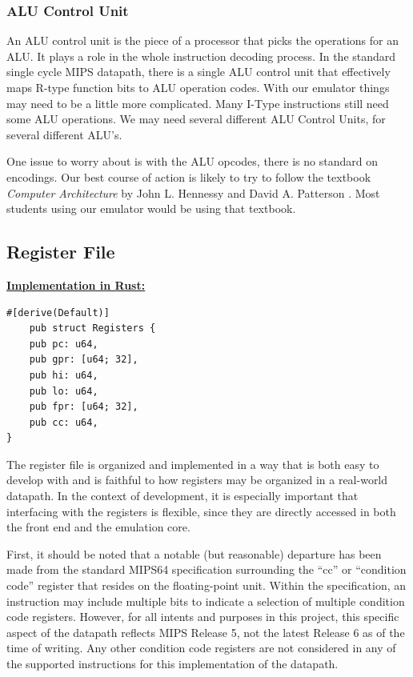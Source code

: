 \documentclass[
    paper=letter,
    parskip=half,
    fontsize=12pt,
    titlepage=firstiscover,
    toc=bibliography,
    numbers=endperiod
]{scrartcl}
\begin{document}
\subsubsection{ALU Control Unit}

An ALU control unit is the piece of a processor that picks the
operations for an ALU. It plays a role in the whole instruction decoding
process. In the standard single cycle MIPS datapath, there is a single
ALU control unit that effectively maps R-type function bits to ALU
operation codes. With our emulator things may need to be a little more
complicated. Many I-Type instructions still need some ALU operations. We
may need several different ALU Control Units, for several different
ALU's.

One issue to worry about is with the ALU opcodes, there is no standard
on encodings. Our best course of action is likely to try to follow the
textbook \emph{Computer Architecture} by John L. Hennessy and David A.
Patterson \cite{hennessy-patterson}. Most students using our emulator would be using that
textbook.

\subsection{Register File}

\underline{\textbf{Implementation in Rust:}}
\begin{verbatim}
#[derive(Default)]
    pub struct Registers {
    pub pc: u64,
    pub gpr: [u64; 32],
    pub hi: u64,
    pub lo: u64,
    pub fpr: [u64; 32],
    pub cc: u64,
}
\end{verbatim}

The register file is organized and implemented in a way that is both
easy to develop with and is faithful to how registers may be organized
in a real-world datapath. In the context of development, it is
especially important that interfacing with the registers is flexible,
since they are directly accessed in both the front end and the emulation
core.

First, it should be noted that a notable (but reasonable) departure has
been made from the standard MIPS64 specification surrounding the ``cc''
or ``condition code'' register that resides on the floating-point unit.
Within the specification, an instruction may include multiple bits to
indicate a selection of multiple condition code registers. However, for
all intents and purposes in this project, this specific aspect of the
datapath reflects MIPS Release 5, not the latest Release 6 as of the
time of writing. Any other condition code registers are not considered
in any of the supported instructions for this implementation of the
datapath.
\end{document}
